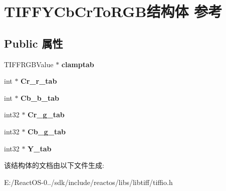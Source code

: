 \hypertarget{struct_t_i_f_f_y_cb_cr_to_r_g_b}{}\section{T\+I\+F\+F\+Y\+Cb\+Cr\+To\+R\+G\+B结构体 参考}
\label{struct_t_i_f_f_y_cb_cr_to_r_g_b}
\subsection*{Public 属性}
\begin{DoxyCompactItemize}
\item 
\mbox{\label{struct_t_i_f_f_y_cb_cr_to_r_g_b_a8e5d436c3de091474ac135094fd465a4}} 
T\+I\+F\+F\+R\+G\+B\+Value $\ast$ {\bfseries clamptab}
\item 
\mbox{\label{struct_t_i_f_f_y_cb_cr_to_r_g_b_a170657dcb7e17f38c6ac71b7c22c56ca}} 
int $\ast$ {\bfseries Cr\+\_\+r\+\_\+tab}
\item 
\mbox{\label{struct_t_i_f_f_y_cb_cr_to_r_g_b_ad368add2ad66f6f80a30f72ffccb90e6}} 
int $\ast$ {\bfseries Cb\+\_\+b\+\_\+tab}
\item 
\mbox{\label{struct_t_i_f_f_y_cb_cr_to_r_g_b_a128f738d1d64b919474e96841b0a9c7d}} 
int32 $\ast$ {\bfseries Cr\+\_\+g\+\_\+tab}
\item 
\mbox{\label{struct_t_i_f_f_y_cb_cr_to_r_g_b_a529a7d1ba3b123003844750dc37ee5da}} 
int32 $\ast$ {\bfseries Cb\+\_\+g\+\_\+tab}
\item 
\mbox{\label{struct_t_i_f_f_y_cb_cr_to_r_g_b_addde4317b92cf7ea8f49fd86aaebccab}} 
int32 $\ast$ {\bfseries Y\+\_\+tab}
\end{DoxyCompactItemize}


该结构体的文档由以下文件生成\+:\begin{DoxyCompactItemize}
\item 
E\+:/\+React\+O\+S-\/0../sdk/include/reactos/libs/libtiff/tiffio.\+h\end{DoxyCompactItemize}
